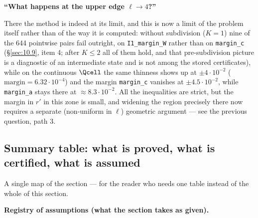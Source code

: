 \textbf{``What happens at the upper edge $\ell \to 4$?''}

There the method is indeed at its limit, and this is now a limit of the
problem itself rather than of the way it is computed: without subdivision
($K = 1$) nine of the 644 pointwise pairs fail outright, on
\texttt{I1\_margin\_W} rather than on \texttt{margin\_c} (\S\ref{sec:10.9},
item 4; after $K \le 2$ all of them hold, and that pre-subdivision picture is a diagnostic of an intermediate state
and is not among the stored certificates), while on the continuous $\Qcell$ the same thinness shows up at $\pm 4\cdot 10^{-2}$
($\mathrm{margin}=6.32\cdot 10^{-4}$) and the margin \texttt{margin\_c} vanishes at
$\pm 4.5\cdot 10^{-2}$, while \texttt{margin\_a} stays there at $\approx 8.3\cdot 10^{-2}$. All the inequalities are
strict, but the margin in $r'$ in this zone is small, and widening the region
precisely there now requires a separate (non-uniform in $\ell$) geometric
argument --- see the previous question, path 3.


\subsection{Summary table: what is proved, what is certified, what is assumed}
\label{sec:10.11}

A single map of the section --- for the reader who needs one table instead of
the whole of this section.

\textbf{Registry of assumptions (what the section takes as given).}

